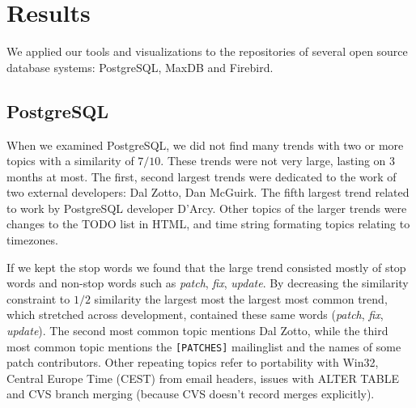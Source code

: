 \documentclass[times, 10pt,twocolumn]{article}
\begin{document}










\section{Results}

We applied our tools and visualizations to the repositories of several
open source database systems: PostgreSQL, MaxDB and Firebird.




\subsection{PostgreSQL}


When we examined PostgreSQL, we did not find many trends with two or
more topics with a similarity of $7/10$. These trends were not very
large, lasting on 3 months at most. The first, second largest trends
were dedicated to the work of two external developers: Dal Zotto, Dan
McGuirk. The fifth largest trend related to work by PostgreSQL developer D'Arcy. Other
topics of the larger trends were changes to the TODO list in HTML, and
time string formating topics relating to timezones.

If we kept the stop words we found that the large trend consisted
mostly of stop words and non-stop words such as \emph{patch},
\emph{fix}, \emph{update}.  By decreasing the similarity constraint to
$1/2$ similarity the largest most the largest most common trend, which
stretched across development, contained these same words
(\emph{patch}, \emph{fix}, \emph{update}). The second most common
topic mentions Dal Zotto, while the third most common topic mentions
the \texttt{[PATCHES]} mailinglist and the names of some patch
contributors.  Other repeating topics refer to portability with Win32,
Central Europe Time (CEST) from email headers, issues with ALTER TABLE
and CVS branch merging (because CVS doesn't record merges explicitly).
\end{document}
